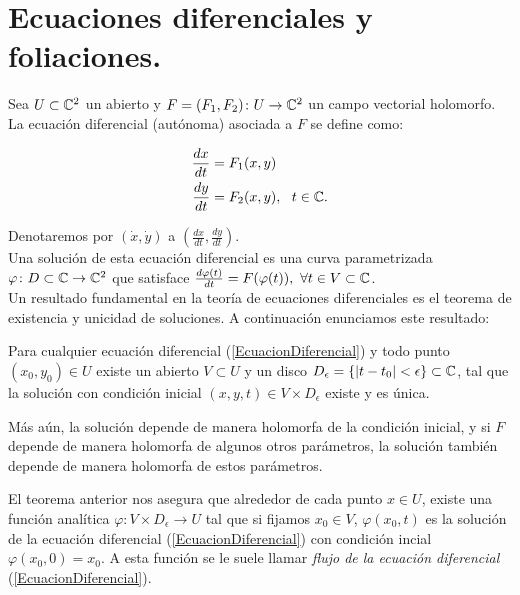\section{Ecuaciones diferenciales y foliaciones.}

Sea $U\subset\mathbb{C}^{2}$ un abierto y $F=(F_{1},F_{2})\colon U\rightarrow\mathbb{C}^{2}$ un campo vectorial holomorfo. La ecuación diferencial (autónoma) asociada a $F$ se define como:

\begin{equation}
\label{EcuacionDiferencial}
\begin{aligned}
\frac{dx}{dt} &=F_{1}(x,y) \\
\frac{dy}{dt} &=F_{2}(x,y),\ \ t\in\mathbb{C}.
\end{aligned}
\end{equation}

Denotaremos por $(\dot{x},\dot{y})$ a $(\tfrac{dx}{dt},\tfrac{dy}{dt})$.\\

Una solución de esta ecuación diferencial es una curva parametrizada $\varphi\colon D\subset\mathbb{C}\rightarrow\mathbb{C}^{2}$ que satisface $\frac{d\varphi(t)}{dt} = F(\varphi(t)),\ \forall t\in V\subset\mathbb{C}$.\\

Un resultado fundamental en la teoría de ecuaciones diferenciales es el teorema de existencia y unicidad de soluciones. A continuación enunciamos este resultado:

\begin{Teorema}
\label{Teo:ExistenciaUnicidad}
\cite{IlyaYako} Para cualquier ecuación diferencial (\ref{EcuacionDiferencial}) y todo punto $(x_{0},y_{0})\in U$ existe un abierto $V\subset U$ y un disco $D_{\epsilon}=\{\left|t-t_{0}\right|<\epsilon \}\subset\mathbb{C}$, tal que la solución con condición inicial $(x,y,t)\in V\times D_{\epsilon}$ existe y es única.

Más aún, la solución depende de manera holomorfa de la condición inicial, y si $F$ depende de manera holomorfa de algunos otros parámetros, la solución también depende de manera holomorfa de estos parámetros.
\end{Teorema}

El teorema anterior nos asegura que alrededor de cada punto $x\in U$, existe una función analítica $\varphi\colon V\times D_{\epsilon}\rightarrow U$ tal que si fijamos $x_{0}\in V$, $\varphi(x_{0},t)$ es la solución de la ecuación diferencial (\ref{EcuacionDiferencial}) con condición incial $\varphi(x_{0},0)=x_{0}$. A esta función se le suele llamar \emph{flujo de la ecuación diferencial} (\ref{EcuacionDiferencial}).

